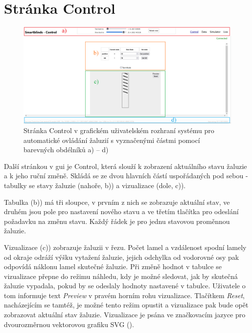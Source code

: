 \section{Stránka Control} \label{sec:control}
    \begin{figure}[h]
        \centering
        \includegraphics[draft=false,width=\textwidth]{img/gui/control.png}
        \caption[Stránka Control v GUI]{Stránka Control v grafickém uživatelském rozhraní systému pro automatické ovládání žaluzií s vyznačenými částmi pomocí barevných obdélníků \textcolor{guired}{a)} -- \textcolor{guiblue}{d)}}
        \label{fig:control}
    \end{figure}
    Další stránkou v \acrshort{gui} je Control, která slouží k zobrazení aktuálního stavu žaluzie a k jeho ruční změně. Skládá se ze dvou hlavních částí uspořádaných pod sebou - tabulky se stavy žaluzie (nahoře, \textcolor{guiorange}{b)}) a vizualizace (dole, \textcolor{guigreen}{c)}).

    Tabulka (\textcolor{guiorange}{b)}) má tři sloupce, v prvním z nich se zobrazuje aktuální stav, ve druhém jsou pole pro nastavení nového stavu a ve třetím tlačítka pro odeslání požadavku na změnu stavu. Každý řádek je pro jednu stavovou proměnnou žaluzie.

    Vizualizace (\textcolor{guigreen}{c)}) zobrazuje žaluzii v řezu. Počet lamel a vzdálenost spodní lamely od okraje odráží výšku vytažení žaluzie, jejich odchylka od vodorovné osy pak odpovídá náklonu lamel skutečné žaluzie. Při změně hodnot v tabulce se vizualizace přepne do režimu náhledu, kdy je možné sledovat, jak by skutečná žaluzie vypadala, pokud by se odeslaly hodnoty nastavené v tabulce. Uživatele o tom informuje text \emph{Preview} v pravém horním rohu vizualizace. Tlačítkem \emph{Reset}, nacházejícím se tamtéž, je možné tento režim opustit a vizualizace pak bude opět zobrazovat aktuální stav žaluzie. Vizualizace je psána ve značkovacím jazyce pro dvourozměrnou vektorovou grafiku SVG (\cite{w3c:svg}).

